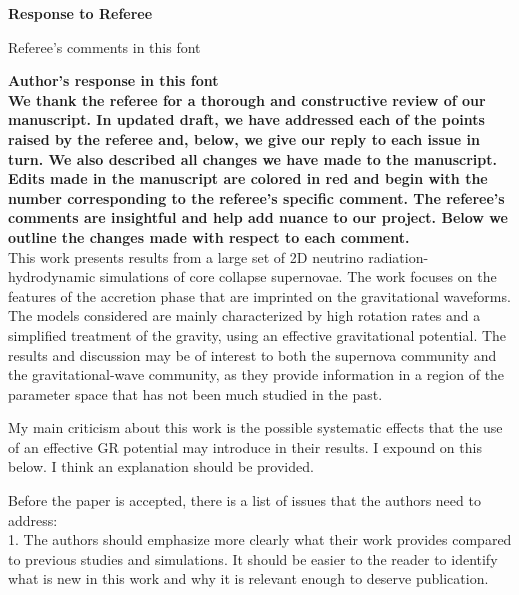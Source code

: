\documentclass[11pt]{article}
\begin{document}
\setcounter{page}{1}  \renewcommand{\thepage}
           {\arabic{page}}%

\begin{center}
{\bf Response to Referee} \vspace{-0.2in}
\end{center}

Referee's comments in this font

\textbf{Author's response in this font}\\

\textbf{We thank the referee for a thorough and constructive review of our manuscript. In updated draft, we have addressed each of the points raised by the referee and, below, we give our reply to each issue in turn. We also described all changes we have made to the manuscript.
Edits made in the manuscript are colored in red and begin with the number corresponding to the referee's specific comment.  The referee's comments are insightful and help add nuance to our project.  Below we outline the changes made with respect to each comment.}\\

This work presents results from a large set of 2D neutrino radiation-hydrodynamic simulations of core collapse supernovae. The work focuses on the features of the accretion phase that are imprinted on the gravitational waveforms. The models considered are mainly characterized by high rotation rates and a simplified treatment of the gravity, using an effective gravitational potential. The results and discussion may be of interest to both the supernova community and the gravitational-wave community, as they provide information in a region of the parameter space that has not been much studied in the past.

My main criticism about this work is the possible systematic effects that the 
use of an effective GR potential may introduce in their results. I expound on
this below. I think an explanation should be provided.

Before the paper is accepted, there is a list of issues that the authors need to 
address:\\

1. The authors should emphasize more clearly what their work provides compared to previous studies and simulations. It should be easier to the reader to identify what is new in this work and why it is relevant enough to deserve publication.\\
\end{document}
